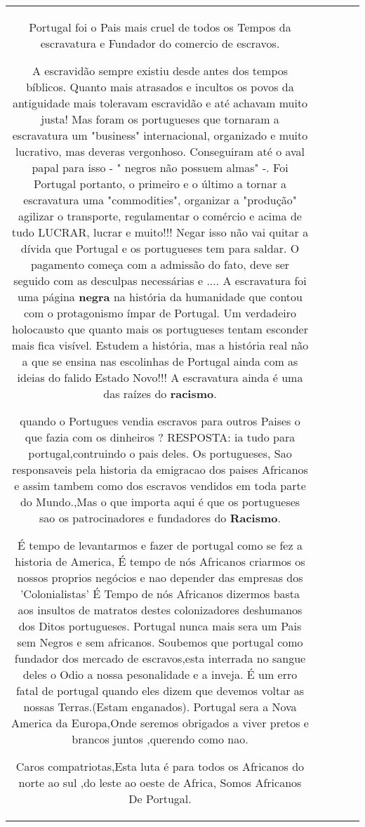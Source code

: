 \documentclass[11pt]{article}
\newlength\mylength
\begin{document}
\begin{center}
\begin{longtable}{|C{.65\mylength}|C{.30\mylength}|C{.12\mylength}|C{.12\mylength}|C{.12\mylength}|}
Portugal foi o Pais mais cruel de todos os Tempos da escravatura e Fundador do comercio de escravos.

A escravidão sempre existiu desde antes dos tempos bíblicos. Quanto mais atrasados e incultos os povos da antiguidade mais toleravam escravidão e até achavam muito justa! Mas foram os portugueses que tornaram a escravatura um "business" internacional, organizado e muito lucrativo, mas deveras vergonhoso. Conseguiram até o aval papal para isso - " negros não possuem almas" -. Foi Portugal portanto, o primeiro e o último a tornar a escravatura uma "commodities", organizar a "produção" agilizar o transporte, regulamentar o comércio e acima de tudo LUCRAR, lucrar e muito!!! Negar isso não vai quitar a dívida que Portugal e os portugueses tem para saldar. O pagamento começa com a admissão do fato, deve ser seguido com as desculpas necessárias e .... A escravatura foi uma página \textbf{negra} na história da humanidade que contou com o protagonismo ímpar de Portugal. Um verdadeiro holocausto que quanto mais os portugueses tentam esconder mais fica visível. Estudem a história, mas a história real não a que se ensina nas escolinhas de Portugal ainda com as ideias do falido Estado Novo!!! A escravatura ainda é uma das raízes do \textbf{racismo}.

quando o Portugues vendia escravos para outros Paises o que fazia com os dinheiros ?
RESPOSTA: ia tudo para portugal,contruindo o pais deles.
Os portugueses, Sao responsaveis pela historia da emigracao dos paises Africanos e assim tambem como dos escravos vendidos em toda parte do Mundo.,Mas o que importa aqui é que os portugueses sao os patrocinadores e fundadores do \textbf{Racismo}.

É tempo de levantarmos e fazer de portugal como se fez a historia de America,
É tempo de nós Africanos criarmos os nossos proprios negócios e nao depender das empresas dos 'Colonialistas'
É Tempo de nós Africanos dizermos basta aos insultos de matratos destes colonizadores deshumanos dos Ditos portugueses. Portugal nunca mais sera um Pais sem Negros e sem africanos.
Soubemos que portugal como fundador dos mercado de escravos,esta interrada no sangue deles o Odio a nossa pesonalidade e a inveja.
É um erro fatal de portugal quando eles dizem que devemos voltar as nossas Terras.(Estam enganados).
Portugal sera a Nova America da Europa,Onde seremos obrigados a viver pretos e brancos juntos ,querendo como nao.

Caros compatriotas,Esta luta é para todos os Africanos do norte ao sul ,do leste ao oeste de Africa, Somos Africanos De Portugal.


\end{longtable}
\end{center}
\end{document}
